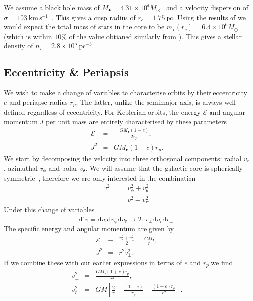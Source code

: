 \documentclass[useAMS,usedcolumn,usegraphicx,usenatbib]{mn2e}
\newcommand{\units}[1]{\ensuremath{~\mathrm{#1}}}
\newcommand{\dd}{\ensuremath{\mathrm{d}}}
\begin{document}
We assume a black hole mass of $M_\bullet = 4.31 \times 10^6 M_\odot$~\cite{Gillessen2009} and a velocity dispersion of $\sigma = 103\units{km\,s^{-1}}$~\cite{Tremaine2002}. This gives a cusp radius of $r_c = 1.75\units{pc}$. Using the results of \citet{Ghez2008} we would expect the total mass of stars in the core to be $m_\star(r_c) = 6.4 \times 10^6 M_\odot$ (which is within $10\%$ of the value obtianed similarly from \citet{Genzel2003}). This gives a stellar density of $n_\star = 2.8 \times 10^5\units{pc^{-3}}$.

\subsection{Eccentricity \& Periapsis}

We wish to make a change of variables to characterise orbits by their eccentricity $e$ and periapse radius $r_p$. The latter, unlike the semimajor axis, is always well defined regardless of eccentricity. For Keplerian orbits, the energy $\mathcal{E}$ and angular momentum $J$ per unit mass are entirely characterised by these parameters
\begin{eqnarray}
\mathcal{E} & = & -\frac{GM_\bullet(1 - e)}{2r_p},\\
J^2 & = & GM_\bullet(1 + e)r_p.
\end{eqnarray}
We start by decomposing the velocity into three orthogonal components: radial $v_r$, azimuthal $v_\phi$ and polar $v_\theta$. We will assume that the galactic core is spherically symmetric~\citep{Genzel2003, Schodel2007}, therefore we are only interested in the combination
\begin{eqnarray}
v_\perp^2 & = & v_\phi^2 + v_\theta^2\\
 & = & v^2 - v_r^2.
\end{eqnarray}
Under this change of variables
\begin{equation}
\dd^2v = \dd v_r \dd v_\phi \dd v_\theta \rightarrow 2\pi v_\perp \dd v_r \dd v_\perp.
\end{equation}
The specific energy and angular momentum are given by
\begin{eqnarray}
\mathcal{E} & = & \frac{v_r^2 + v_\perp^2}{2} - \frac{GM_\bullet}{r},\\
J^2 & = & r^2 v_\perp^2.
\end{eqnarray}
If we combine these with our earlier expressions in terms of $e$ and $r_p$ we find
\begin{eqnarray}
v_\perp^2 & = & \frac{GM_\bullet(1 + e)r_p}{r^2},\\
v_r^2 & = & GM\left[\frac{2}{r} - \frac{(1 - e)}{r_p} - \frac{(1 + e)r_p}{r^2}\right].
\end{eqnarray}
\end{document}

